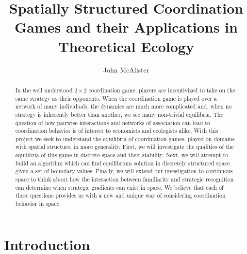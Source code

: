 \documentclass[]{article}
\title{Spatially Structured Coordination Games and their Applications in Theoretical Ecology}
\author{John McAlister}
\begin{document}
\maketitle

\begin{abstract}
	In the well understood $2\times 2$ coordination game, players are incentivized to take on the same strategy as their opponents. When the coordination game is played over a network of many individuals, the dynamics are much more complicated and, when no strategy is inherently better than another, we see many non-trivial equilibria.  The question of how pairwise interactions and networks of association can lead to coordination behavior is of interest to economists and ecologists alike. With this project we seek to understand the equilibria of coordination games, played on domains with spatial structure, in more generality. First, we will investigate the qualities of the equilibria of this game in discrete space and their stability. Next, we will attempt to build an algorithm which can find equilibrium solution in discretely structured space given a set of boundary values. Finally, we will extend our investigation to continuous space to think about how the interaction between familiarity and strategic recognition can determine when strategic gradients can exist in space. We believe that each of these questions provides us with a new and unique way of considering coordination behavior in space. 
\end{abstract}
	\section{Introduction}\label{introduction}
\end{document}

